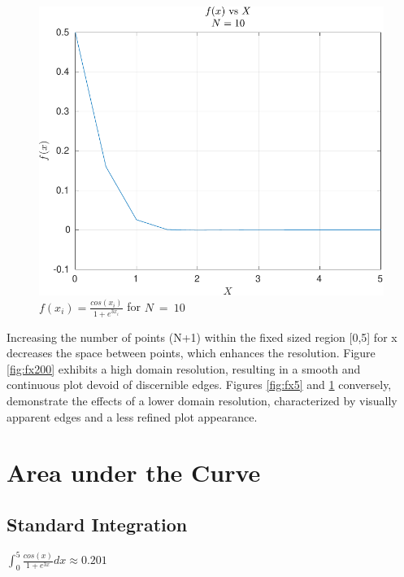 \documentclass[12pt]{article}
\begin{document}
			\begin{figure}[H]
				\centering
				\includegraphics[width=1\linewidth]{Code/Fig/fx_10.pdf}
				\caption{\Large $f(x_{i}) = \frac{cos(x_{i})}{1 + e^{3x_{i}}}$ for $N \ = \ 10$}
				\label{fig:fx10}
			\end{figure}
			  Increasing the number of points (N+1) within the fixed sized region [0,5] for x decreases
			  the space between points, which enhances the resolution. Figure \ref{fig:fx200} exhibits a high domain resolution, resulting in a smooth and continuous plot devoid of discernible edges. Figures \ref{fig:fx5} and \ref{fig:fx10} conversely, demonstrate the effects of a lower domain resolution, characterized by visually apparent edges and a less refined plot appearance. 
			
	\section {Area under the Curve}
		\subsection{Standard Integration}
			
			\begin{center}
				\LARGE $\int_{0}^{5} \frac{cos(x)}{1 + e^{3x}} dx \approx 0.201$
			\end{center}
			
\end{document}

